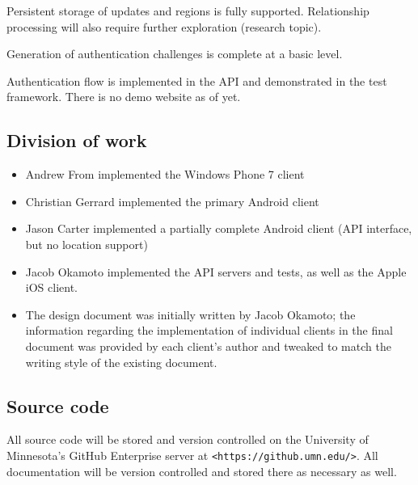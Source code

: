 \documentclass[11pt]{article} %
\begin{document}
Persistent storage of updates and regions is fully supported. Relationship processing will also require further exploration (research topic).

Generation of authentication challenges is complete at a basic level.

Authentication flow is implemented in the API and demonstrated in the test framework. There is no demo website as of yet.

\subsection{Division of work}
\begin{itemize}
\item Andrew From implemented the Windows Phone 7 client
\item Christian Gerrard implemented the primary Android client
\item Jason Carter implemented a partially complete Android client (API interface, but no location support)
\item Jacob Okamoto implemented the API servers and tests, as well as the Apple iOS client.
\item The design document was initially written by Jacob Okamoto; the information regarding the implementation of individual clients in the final document was provided by each client's author and tweaked to match the writing style of the existing document.
\end{itemize}

\subsection{Source code}
All source code will be stored and version controlled on the University of Minnesota's GitHub Enterprise server at \texttt{<https://github.umn.edu/>}. All documentation will be version controlled and stored there as necessary as well.
\end{document}
